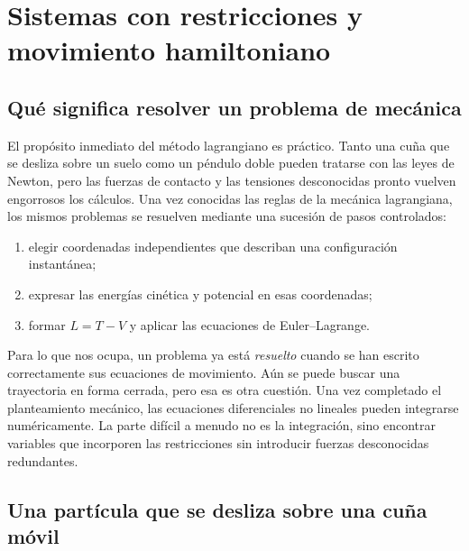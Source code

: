 \chapter{Sistemas con restricciones y movimiento hamiltoniano}


\section{Qué significa resolver un problema de mecánica}

El propósito inmediato del método lagrangiano es práctico. Tanto una cuña que se desliza sobre un suelo como un péndulo doble pueden tratarse con las leyes de Newton, pero las fuerzas de contacto y las tensiones desconocidas pronto vuelven engorrosos los cálculos. Una vez conocidas las reglas de la mecánica lagrangiana, los mismos problemas se resuelven mediante una sucesión de pasos controlados:
\begin{enumerate}
  \item elegir coordenadas independientes que describan una configuración instantánea;
  \item expresar las energías cinética y potencial en esas coordenadas;
  \item formar \(L=T-V\) y aplicar las ecuaciones de Euler--Lagrange.
\end{enumerate}

Para lo que nos ocupa, un problema ya está \emph{resuelto} cuando se han escrito correctamente sus ecuaciones de movimiento. Aún se puede buscar una trayectoria en forma cerrada, pero esa es otra cuestión. Una vez completado el planteamiento mecánico, las ecuaciones diferenciales no lineales pueden integrarse numéricamente. La parte difícil a menudo no es la integración, sino encontrar variables que incorporen las restricciones sin introducir fuerzas desconocidas redundantes.

\section{Una partícula que se desliza sobre una cuña móvil}

